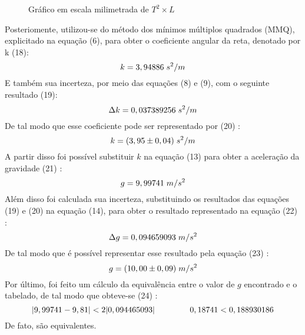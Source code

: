 \documentclass[12pt, letterpaper]{article}
\begin{document}
\begin{figure}[!h]
    \centering
    \caption{Gráfico em escala milimetrada de $T^2 \times L$}
    \label{Elaborado pelos autores}
\end{figure}



Posteriomente, utilizou-se do método dos mínimos múltiplos quadrados (MMQ), explicitado na equação (6), para obter o coeficiente angular da reta, denotado por k (18):
\begin{equation}
 k = 3,94886 \hspace{0.1cm} s^2/m
 \end{equation}
 E também sua incerteza, por meio das equações (8)  e (9), com o seguinte resultado (19):
 \begin{equation}
 \Delta k = 0,037389256  \hspace{0.1cm} s^2/m 
 \end{equation}
 De tal modo que esse coeficiente pode ser representado por (20) :
 \begin{equation}
    k = (3,95 \pm 0,04) \hspace{0.1cm} s^2/m 
 \end{equation}
 A partir disso foi possível substituir $k$ na equação (13) para obter a  aceleração da gravidade (21) :
 \begin{equation}
    g = 9,99741\hspace{0.1cm} m/s^2
 \end{equation}
 Além disso foi calculada sua incerteza, substituindo os resultados das equações (19) e (20) na equação (14), para obter o resultado representado na equação (22) :
\begin{equation}
  \Delta g = 0,094659093 \hspace{0.1cm} m/s^2
\end{equation}
De tal modo que é possível representar esse resultado pela equação (23) :
    \begin{equation}
    g = (10,00 \pm 0,09) \hspace{0.1cm} m/s^2
    \end{equation}
    Por último, foi feito um cálculo da equivalência entre o valor de
$g$ encontrado e o tabelado, de tal modo que obteve-se (24) :
    \begin{equation}
     |9,99741 - 9,81| < 2|0,094465093|\hspace{1.5cm}    0,18741 < 0,188930186
    \end{equation}
    De fato, são equivalentes.
\end{document}
